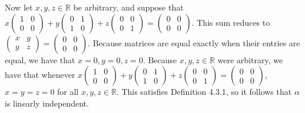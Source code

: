 \documentclass[12pt]{article}
\newenvironment{problem}[2][Problem]
{
	\begin{trivlist} 
		\item[\hskip \labelsep {\bfseries #1 #2:}]
	}
{
	\end{trivlist}
	}
\begin{document}
\begin{problem}{5}
\newpage
Now let $x,y,z \in \mathbb{R}$ be arbitrary, and suppose that $x\begin{pmatrix} 1&0\\0&0 \end{pmatrix} + y \begin{pmatrix} 0&1\\1&0 \end{pmatrix} + z \begin{pmatrix} 0&0\\0&1 \end{pmatrix} = \begin{pmatrix}0&0\\0&0\end{pmatrix}$. This sum reduces to $\begin{pmatrix}x&y\\y&z\end{pmatrix} = \begin{pmatrix}0&0\\0&0\end{pmatrix}$. Because matrices are equal exactly when their entries are equal, we have that $x=0,y=0,z=0$.  Because $x,y,z \in \mathbb{R}$ were arbitrary, we have that whenever $x\begin{pmatrix} 1&0\\0&0 \end{pmatrix} + y \begin{pmatrix} 0&1\\1&0 \end{pmatrix} + z \begin{pmatrix} 0&0\\0&1 \end{pmatrix} = \begin{pmatrix}0&0\\0&0\end{pmatrix}$, $x=y=z=0$ for all $x,y,z \in \mathbb{R}$. This satisfies Definition 4.3.1, so it follows that $\alpha$ is linearly independent.


\end{problem}
\end{document}
